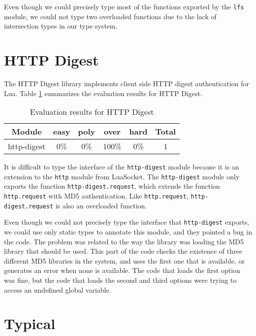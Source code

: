 Even though we could precisely type most of the functions exported
by the \texttt{lfs} module, we could not type two overloaded functions
due to the lack of intersection types in our type system.

\section{HTTP Digest}

The HTTP Digest library implements client side HTTP digest authentication for Lua.
Table \ref{tab:evalhttpdigest} summarizes the evaluation results for HTTP Digest.

\begin{table}[!ht]
\begin{center}
\begin{tabular}{|c|c|c|c|c|c|}
\hline
\textbf{Module} & \textbf{easy} & \textbf{poly} & \textbf{over} & \textbf{hard} & \textbf{Total} \\
\hline
http-digest & 0\% & 0\% & 100\% & 0\% & 1 \\ %
\hline
\end{tabular}
\end{center}
\caption{Evaluation results for HTTP Digest}
\label{tab:evalhttpdigest}
\end{table}

It is difficult to type the interface of the \texttt{http-digest} module
because it is an extension to the \texttt{http} module from LuaSocket.
The \texttt{http-digest} module only exports the function
\texttt{http-digest.request}, which extends the function
\texttt{http.request} with MD5 authentication.
Like \texttt{http.request}, \texttt{http-digest.request}
is also an overloaded function.

Even though we could not precisely type the interface that \texttt{http-digest}
exports, we could use only static types to annotate this module,
and they pointed a bug in the code.
The problem was related to the way the library was loading the MD5 library
that should be used. 
This part of the code checks the existence of three different MD5 libraries
in the system, and uses the first one that is available, or generates an
error when none is available.
The code that loads the first option was fine, but the code that loads the
second and third options were trying to access an undefined global variable.

\section{Typical}

